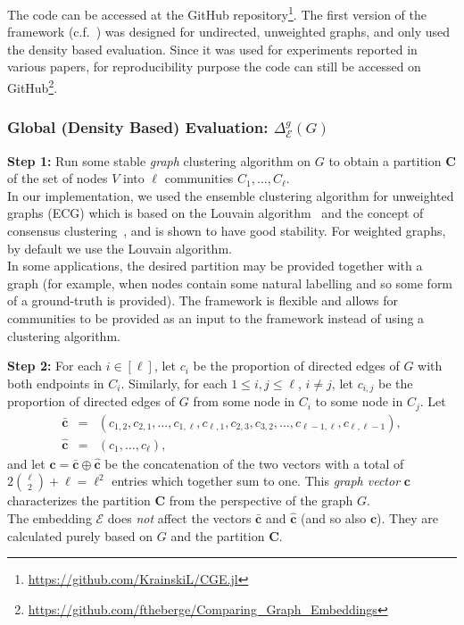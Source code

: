 \documentclass[11pt]{article}
\newcommand{\emb}{\mathcal E}
\begin{document}
The code can be accessed at the GitHub repository\footnote{\url{https://github.com/KrainskiL/CGE.jl}}. The first version of the framework (c.f.~\cite{Embedding_Complex_Networks}) was designed for undirected, unweighted graphs, and only used the density based evaluation. Since it was used for experiments reported in various papers, for reproducibility purpose the code can still be accessed on GitHub\footnote{\url{https://github.com/ftheberge/Comparing\_Graph\_Embeddings}}.

\subsubsection{Global (Density Based) Evaluation: $\Delta_\emb^g(G)$}

\medskip \noindent \textbf{Step 1:} Run some stable \emph{graph} clustering algorithm on $G$ to obtain a partition $\textbf{C}$ of the set of nodes $V$ into $\ell$ communities $C_1, \ldots, C_\ell$. \\
In our implementation, we used the ensemble clustering algorithm for unweighted graphs (ECG) which is based on the Louvain algorithm~\cite{louvain} and the concept of consensus clustering~\cite{Poulin2019}, and is shown to have good stability. For weighted graphs, by default we use the Louvain algorithm. \\
In some applications, the desired partition may be provided together with a graph (for example, when nodes contain some natural labelling and so some form of a ground-truth is provided). The framework is flexible and allows for communities to be provided as an input to the framework instead of using a clustering algorithm.

\medskip \noindent \textbf{Step 2:} For each $i \in [\ell]$, let $c_{i}$ be the proportion of directed edges of $G$ with both endpoints in $C_i$. Similarly, for each $1 \le i, j \le \ell$, $i \neq j$, let $c_{i,j}$ be the proportion of directed edges of $G$ from some node in $C_i$ to some node in $C_j$. Let
\begin{eqnarray}
\bar{\textbf{c}} &=& (c_{1,2},c_{2,1},\ldots, c_{1,\ell}, c_{\ell,1}, c_{2,3}, c_{3,2}, \ldots, c_{\ell-1,\ell}, c_{\ell,\ell-1} ), \nonumber \\
\hat{\textbf{c}} &=& (c_1, \ldots, c_\ell), \label{eq:c}
\end{eqnarray}
and let $\textbf{c} = \bar{\textbf{c}} \oplus \hat{\textbf{c}}$ be the concatenation of the two vectors with a total of $2 \binom{\ell}{2} + \ell = \ell^2$ entries which together sum to one. This {\it graph vector} $\textbf{c}$ characterizes the partition $\textbf{C}$ from the perspective of the graph $G$. \\
The embedding $\emb$ does \emph{not} affect the vectors $\bar{\textbf{c}}$ and $\hat{\textbf{c}}$ (and so also $\textbf{c}$).
They are calculated purely based on $G$ and the partition $\textbf{C}$.
\end{document}

